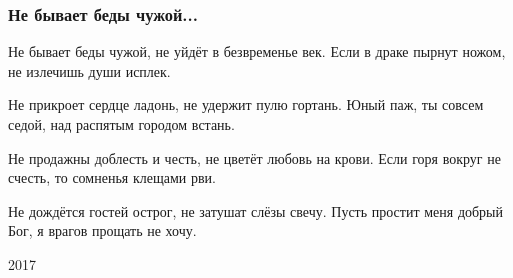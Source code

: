  
 
 

\subsubsection{Не бывает беды чужой...}
\label{sec:poetry.rus.dnr.vladislav_rusanov.ne_byvajet_bedy_chuzhoj}

Не бывает беды чужой,
не уйдёт в безвременье век.
Если в драке пырнут ножом,
не излечишь души исплек.

Не прикроет сердце ладонь,
не удержит пулю гортань.
Юный паж, ты совсем седой,
над распятым городом встань.

Не продажны доблесть и честь,
не цветёт любовь на крови.
Если горя вокруг не счесть,
то сомненья клещами рви.

Не дождётся гостей острог,
не затушат слёзы свечу.
Пусть простит меня добрый Бог,
я врагов прощать не хочу.

2017 
